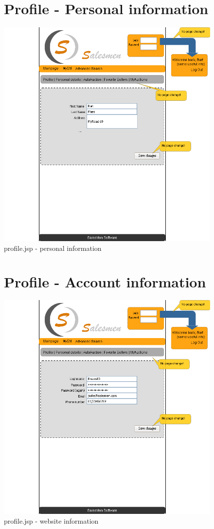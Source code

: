 \documentclass[a4paper, 12pt]{report}
\begin{document}
\begin{figure}
\section{Profile - Personal information}
\label{fig_prototype_personal_info}
\includegraphics[width=15cm]{../../img/SM_mySM_personal.png}
\caption{profile.jsp - personal information}
\end{figure}
\begin{figure}
\section{Profile - Account information}
\label{fig_prototype_account_info}
\includegraphics[width=15cm]{../../img/SM_mySM_profile.png}
\caption{profile.jsp - website information}
\end{figure}
\end{document}

